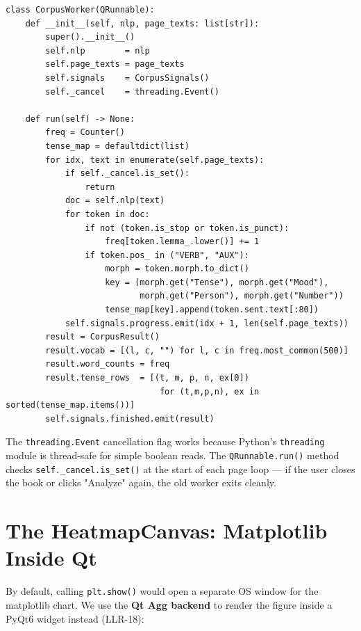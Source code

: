 \documentclass[12pt,oneside]{book}
\begin{document}
\begin{lstlisting}[caption={CorpusWorker iterates all pages (HLR-01, LLR-17, LLR-19, LLR-20)}]
class CorpusWorker(QRunnable):
    def __init__(self, nlp, page_texts: list[str]):
        super().__init__()
        self.nlp        = nlp
        self.page_texts = page_texts
        self.signals    = CorpusSignals()
        self._cancel    = threading.Event()

    def run(self) -> None:
        freq = Counter()
        tense_map = defaultdict(list)
        for idx, text in enumerate(self.page_texts):
            if self._cancel.is_set():
                return
            doc = self.nlp(text)
            for token in doc:
                if not (token.is_stop or token.is_punct):
                    freq[token.lemma_.lower()] += 1
                if token.pos_ in ("VERB", "AUX"):
                    morph = token.morph.to_dict()
                    key = (morph.get("Tense"), morph.get("Mood"),
                           morph.get("Person"), morph.get("Number"))
                    tense_map[key].append(token.sent.text[:80])
            self.signals.progress.emit(idx + 1, len(self.page_texts))
        result = CorpusResult()
        result.vocab = [(l, c, "") for l, c in freq.most_common(500)]
        result.word_counts = freq
        result.tense_rows  = [(t, m, p, n, ex[0])
                               for (t,m,p,n), ex in sorted(tense_map.items())]
        self.signals.finished.emit(result)
\end{lstlisting}

\begin{notebox}
The \texttt{threading.Event} cancellation flag works because Python's
\texttt{threading} module is thread-safe for simple boolean reads. The
\texttt{QRunnable.run()} method checks \texttt{self.\_cancel.is\_set()}
at the start of each page loop — if the user closes the book or clicks
"Analyze" again, the old worker exits cleanly.
\end{notebox}

\section{The HeatmapCanvas: Matplotlib Inside Qt}

By default, calling \texttt{plt.show()} would open a separate OS window for the
matplotlib chart. We use the \textbf{Qt Agg backend} to render the figure inside
a PyQt6 widget instead (LLR-18):
\end{document}
